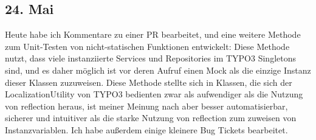 \subsection{24. Mai}
Heute habe ich Kommentare zu einer PR bearbeitet, und eine weitere Methode zum Unit-Testen von nicht-statischen Funktionen entwickelt: Diese Methode nutzt, dass viele instanziierte Services und Repositories im TYPO3 Singletons sind, und es daher möglich ist vor deren Aufruf einen Mock als die einzige Instanz dieser Klassen zuzuweisen. Diese Methode stellte sich in Klassen, die sich der LocalizationUtility von TYPO3 bedienten zwar als aufwendiger als die Nutzung von reflection heraus, ist meiner Meinung nach aber besser automatisierbar, sicherer und intuitiver als die starke Nutzung von reflection zum zuweisen von Instanzvariablen.
Ich habe außerdem einige kleinere Bug Tickets bearbeitet.